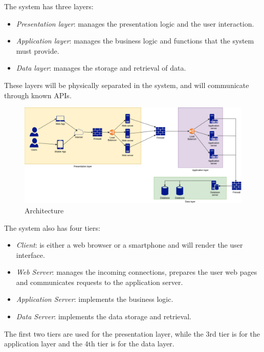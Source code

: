 \documentclass{article}
\begin{document}
    The system has three layers:
    \begin{itemize} 
        \item \textit{Presentation layer}: manages the presentation logic and the user interaction.
        \item \textit{Application layer}: manages the business logic and functions that the system must provide.
        \item \textit{Data layer}: manages the storage and retrieval of data.
    \end{itemize}
    
    These layers will be physically separated in the system, and will communicate through known APIs. \par

    \begin{figure} [h]
        \centering
        \includegraphics[width=1\textwidth]{images/ArchitecturalDesign/Architecture.png}
        \caption{\label{fig:Architecture}Architecture}
    \end{figure}
    
    \newpage

    The system also has four tiers:
    \begin{itemize}
        \item \textit{Client}: is either a web browser or a smartphone and will render the user interface.
        \item \textit{Web Server}: manages the incoming connections, prepares the user web pages and communicates requests to the application server.
        \item \textit{Application Server}: implements the business logic.
        \item \textit{Data Server}: implements the data storage and retrieval.
    \end{itemize}

    The first two tiers are used for the presentation layer, while the 3rd tier is for the application layer and the 4th tier is for the data layer. \par
    
\end{document}
